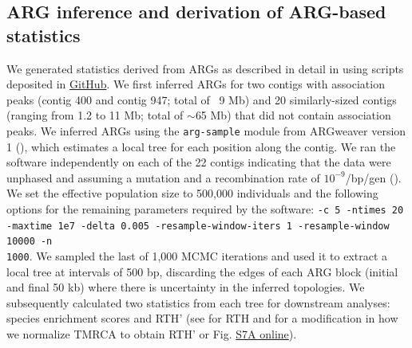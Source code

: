 \subsection{\ac{ARG} inference and derivation of \ac{ARG}-based statistics}
We generated statistics derived from \acp{ARG} as described in detail in \cite{hejase_genomic_2020} using scripts deposited in \href{https://github.com/CshlSiepelLab/bird_capuchino_analysis}{GitHub}. We first inferred \acp{ARG} for two contigs with association peaks (contig 400 and contig 947; total of ~9 Mb) and 20 similarly-sized contigs (ranging from 1.2 to 11 Mb; total of $\sim$65 Mb) that did not contain association peaks. We inferred \acp{ARG} using the \texttt{arg-sample} module from ARGweaver version 1 (\cite{rasmussen_genome-wide_2014}), which estimates a local tree for each position along the contig. We ran the software independently on each of the 22 contigs indicating that the data were unphased and assuming a mutation and a recombination rate of $10^{-9}$/bp/gen (\cite{hejase_genomic_2020,smeds2016direct}). We set the effective population size to 500,000 individuals and the following options for the remaining parameters required by the software: \texttt{-c 5 -ntimes 20 -maxtime 1e7 -delta 0.005 -resample-window-iters 1 -resample-window 10000 -n\\ 1000}. We sampled the last of 1,000 \acs{MCMC} iterations and used it to extract a local tree at intervals of 500 bp, discarding the edges of each \ac{ARG} block (initial and final 50 kb) where there is uncertainty in the inferred topologies. We subsequently calculated two statistics from each tree for downstream analyses: species enrichment scores and \acs{RTH}’ (see \cite{rasmussen_genome-wide_2014} for \acs{RTH} and \cite{hejase_genomic_2020} for a modification in how we normalize \ac{TMRCA} to obtain \acs{RTH}’ or Fig. \href{https://journals.plos.org/PLOSGENETICS/article?id=10.1371/journal.pgen.1010474#sec017}{S7A online}).


